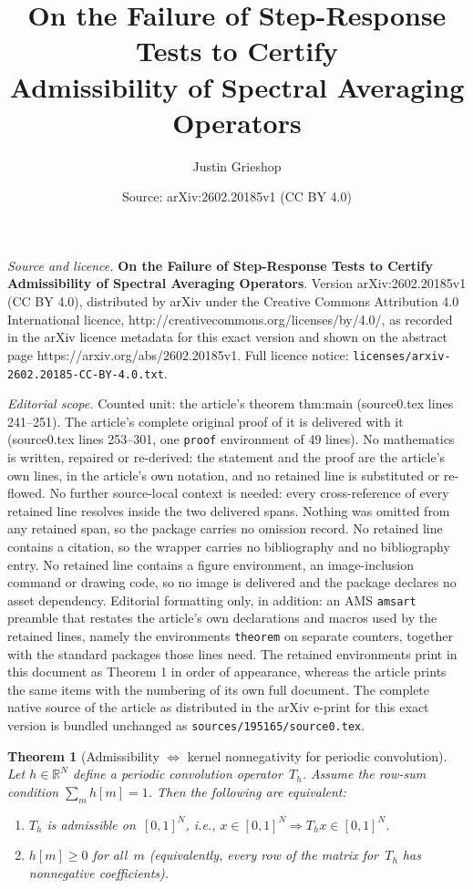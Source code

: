 \documentclass[10pt,a4paper]{amsart}
\title{\textbf{On the Failure of Step-Response Tests to Certify\\[4pt] Admissibility of Spectral Averaging Operators}}
\author{Justin Grieshop}
\date{Source: arXiv:2602.20185v1 (CC BY 4.0)}
\newtheorem{theorem}{Theorem}
\newcommand{\R}{\mathbb{R}}
\begin{document}
\maketitle

\noindent\emph{Source and licence.} \textbf{On the Failure of Step-Response Tests to Certify\\[4pt] Admissibility of Spectral Averaging Operators}. Version arXiv:2602.20185v1 (CC BY 4.0), distributed by arXiv under the Creative Commons Attribution 4.0 International licence, http://creativecommons.org/licenses/by/4.0/, as recorded in the arXiv licence metadata for this exact version and shown on the abstract page https://arxiv.org/abs/2602.20185v1. Full licence notice: \texttt{licenses/arxiv-2602.20185-CC-BY-4.0.txt}.\par\smallskip

\noindent\textit{Editorial scope.} Counted unit: the article's theorem thm:main (source0.tex lines 241--251). The article's complete original proof of it is delivered with it (source0.tex lines 253--301, one \texttt{proof} environment of 49 lines). No mathematics is written, repaired or re-derived: the statement and the proof are the article's own lines, in the article's own notation, and no retained line is substituted or re-flowed.  No further source-local context is needed: every cross-reference of every retained line resolves inside the two delivered spans.  Nothing was omitted from any retained span, so the package carries no omission record.  No retained line contains a citation, so the wrapper carries no bibliography and no bibliography entry.  No retained line contains a figure environment, an image-inclusion command or drawing code, so no image is delivered and the package declares no asset dependency.  Editorial formatting only, in addition: an AMS \texttt{amsart} preamble that restates the article's own declarations and macros used by the retained lines, namely the environments \texttt{theorem} on separate counters, together with the standard packages those lines need.  The retained environments print in this document as Theorem 1 in order of appearance, whereas the article prints the same items with the numbering of its own full document.  The complete native source of the article as distributed in the arXiv e-print for this exact version is bundled unchanged as \texttt{sources/195165/source0.tex}.
\begin{theorem}[Admissibility $\Leftrightarrow$ kernel nonnegativity for periodic convolution]
\label{thm:main}
Let $h \in \R^N$ define a periodic convolution operator~$T_h$.  Assume the
row-sum condition $\sum_{m} h[m] = 1$.  Then the following are equivalent:
\begin{enumerate}[label=(\roman*)]
  \item $T_h$ is admissible on~$[0,1]^N$, i.e.,
        $x \in [0,1]^N \Rightarrow T_h x \in [0,1]^N$.
  \item $h[m] \ge 0$ for all~$m$ (equivalently, every row of the matrix
        for~$T_h$ has nonnegative coefficients).
\end{enumerate}
\end{theorem}
\end{document}
